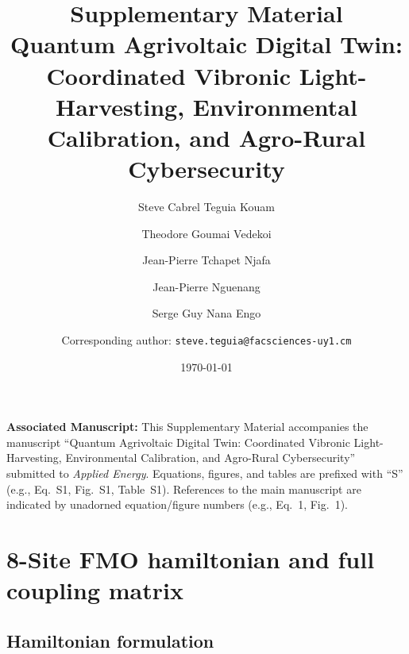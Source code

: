 \documentclass[11pt,a4paper]{article}
\begin{document}
\title{\textbf{Supplementary Material}\\[0.5em]
\large Quantum Agrivoltaic Digital Twin: Coordinated Vibronic Light-Harvesting, Environmental Calibration, and Agro-Rural Cybersecurity}

\author{Steve Cabrel Teguia Kouam}
\author{Theodore Goumai Vedekoi}
\author{Jean-Pierre Tchapet Njafa}
\author{Jean-Pierre Nguenang}
\author{Serge Guy Nana Engo}
\author{Corresponding author: \texttt{steve.teguia@facsciences-uy1.cm}}

\date{\today}

\maketitle

\noindent\textbf{Associated Manuscript:}
This Supplementary Material accompanies the manuscript ``Quantum Agrivoltaic Digital Twin: Coordinated Vibronic Light-Harvesting, Environmental Calibration, and Agro-Rural Cybersecurity'' submitted to \textit{Applied Energy}.
Equations, figures, and tables are prefixed with ``S'' (e.g., Eq.~S1, Fig.~S1, Table~S1).
References to the main manuscript are indicated by unadorned equation/figure numbers (e.g., Eq.~1, Fig.~1).

\vspace{1em}

\tableofcontents

\newpage


\section{8-Site FMO hamiltonian and full coupling matrix}
\label{SI-sec:hamiltonian}

\subsection{Hamiltonian formulation}
\end{document}
